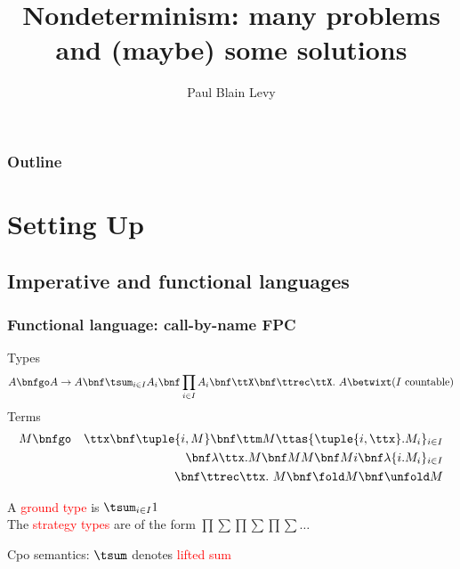 \documentclass{beamer}
\title[Nondeterminism survey]{Nondeterminism: many problems and (maybe) some solutions}
\author{Paul Blain Levy}\institute{University of Birmingham}
\newcommand{\red}[1]{\textcolor{red}{#1}}
\begin{document}
\begin{frame}
\titlepage
\end{frame}

\begin{frame}\frametitle{Outline}
\tableofcontents  
\end{frame}

\section{Setting Up}

\subsection{Imperative and functional languages}

\begin{frame}\frametitle{Functional language: call-by-name FPC}

Types
\begin{displaymath}
  A \bnfgo A \rightarrow A \bnf \tsum_{i \in I} A_{i} \bnf \prod_{i \in I} A_{i} \bnf \ttX \bnf \ttrec \ttX.\ A  \betwixt \mbox{($I$ countable)}
\end{displaymath}
Terms 
\begin{eqnarray*}
  M & \bnfgo &  \ttx \bnf \tuple{i,M} \bnf \ttm M \ttas \{\tuple{i,\ttx}.M_{i}\}_{i \in I} \\
  & &   \bnf \lambda \ttx. M \bnf  MM \bnf Mi \bnf \lambda\{i.M_{i}\}_{i \in I} \\
  &  & \bnf \ttrec \ttx.\ M \bnf  \fold M \bnf \unfold M
\end{eqnarray*}

\pause

A \red{ground type} is $\tsum_{i \in I}1$ \\ \medskip
The \red{strategy types} are of the form $\prod \sum \prod \sum \prod \sum \ldots$ \medskip

Cpo semantics: $\tsum$ denotes \red{lifted sum}

\end{frame}
\end{document}
